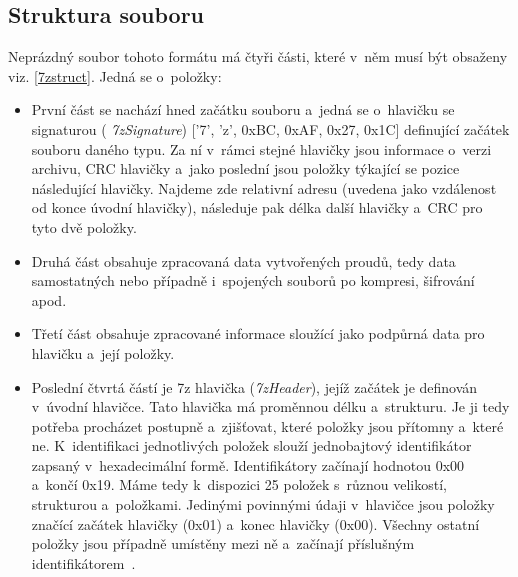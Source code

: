\subsection{Struktura souboru}
\label{ssec:7z_struct}
Neprázdný soubor tohoto formátu má čtyři části, které v~něm musí být obsaženy viz.
\ref{7zstruct}. Jedná se o~položky: 
\begin{itemize}
    \item První část se nachází hned začátku souboru a~jedná se o~hlavičku se signaturou ({\it
	7zSignature}) ['7', 'z', 0xBC, 0xAF, 0x27, 0x1C] definující začátek souboru daného typu.
	Za ní v~rámci stejné hlavičky jsou informace o~verzi archivu, CRC hlavičky a~jako poslední
	jsou položky týkající se pozice následující hlavičky. Najdeme zde relativní adresu
	(uvedena jako vzdálenost od konce úvodní hlavičky), následuje pak délka další hlavičky a~CRC pro tyto dvě položky.
    \item Druhá část obsahuje zpracovaná data vytvořených proudů, tedy data samostatných nebo
	případně i~spojených souborů po kompresi, šifrování apod.
    \item Třetí část obsahuje zpracované informace sloužící jako podpůrná data pro hlavičku a~její
	položky.
    \item Poslední čtvrtá částí je 7z hlavička ({\it 7zHeader}), jejíž začátek je definován
	v~úvodní hlavičce. Tato hlavička má proměnnou délku a~strukturu. Je ji tedy potřeba
	procházet postupně a~zjišťovat, které položky jsou přítomny a~které ne. K~identifikaci
	jednotlivých položek slouží jednobajtový identifikátor zapsaný v~hexadecimální formě.
	Identifikátory začínají hodnotou 0x00 a~končí 0x19. Máme tedy k~dispozici 25 položek
	s~různou velikostí, strukturou a~položkami. Jedinými povinnými údaji v~hlavičce jsou
	položky značící začátek hlavičky (0x01) a~konec hlavičky (0x00). Všechny ostatní položky
	jsou případně umístěny mezi ně a~začínají příslušným identifikátorem~\cite{Pavlov:2010}.  
\end{itemize}
